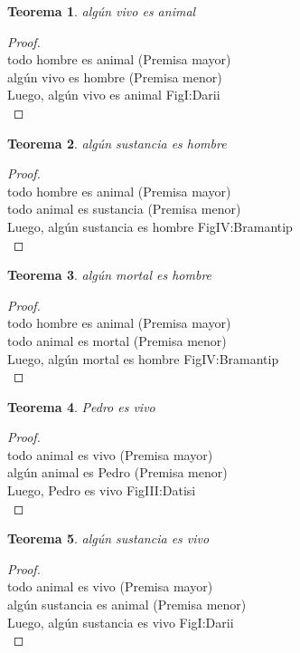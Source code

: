 ﻿\documentclass[12pt]{book}
\newtheorem{theorem}{Teorema}[chapter]
\newtheorem{proof}{Demostración}
\begin{document}
\begin{theorem}
algún vivo es animal
\label{th: 36}
\end{theorem}\begin{proof}\\todo hombre es animal	 (Premisa mayor) \\algún vivo es hombre	 (Premisa menor) \\Luego, algún vivo es animal	FigI:Darii \\ \end{proof}
\begin{theorem}
algún sustancia es hombre
\label{th: 37}
\end{theorem}\begin{proof}\\todo hombre es animal	 (Premisa mayor) \\todo animal es sustancia	 (Premisa menor) \\Luego, algún sustancia es hombre	FigIV:Bramantip \\ \end{proof}
\begin{theorem}
algún mortal es hombre
\label{th: 38}
\end{theorem}\begin{proof}\\todo hombre es animal	 (Premisa mayor) \\todo animal es mortal	 (Premisa menor) \\Luego, algún mortal es hombre	FigIV:Bramantip \\ \end{proof}
\begin{theorem}
Pedro es vivo
\label{th: 39}
\end{theorem}\begin{proof}\\todo animal es vivo	 (Premisa mayor) \\algún animal es Pedro	 (Premisa menor) \\Luego, Pedro es vivo	FigIII:Datisi \\ \end{proof}
\begin{theorem}
algún sustancia es vivo
\label{th: 40}
\end{theorem}\begin{proof}\\todo animal es vivo	 (Premisa mayor) \\algún sustancia es animal	 (Premisa menor) \\Luego, algún sustancia es vivo	FigI:Darii \\ \end{proof}
\end{document}
